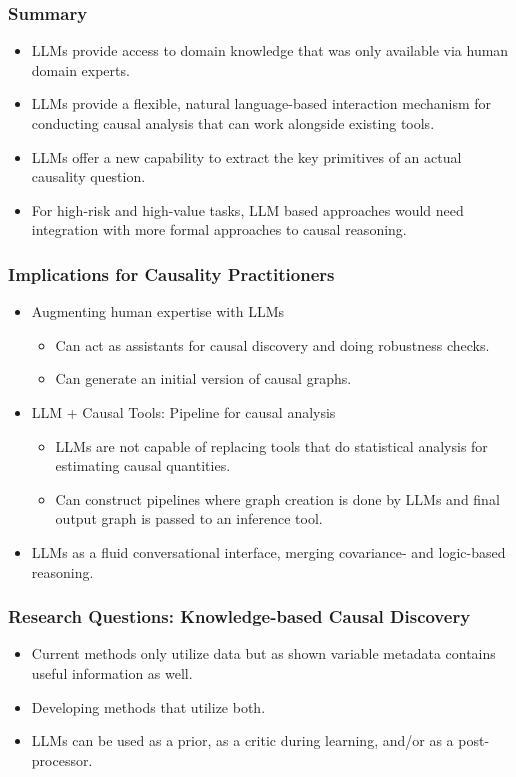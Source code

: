 \documentclass{beamer}
\begin{document}
\begin{frame}
	\frametitle{Summary}
	\begin{itemize}
		\item LLMs provide access to domain knowledge that was only available
			via human domain experts.
		\item LLMs provide a flexible, natural language-based interaction 
			mechanism for conducting causal analysis that can work
			alongside existing tools.
		\item LLMs offer a new capability to extract the key primitives of
			an actual causality question.
		\item For high-risk and high-value tasks, LLM based approaches would
			need integration with more formal approaches to
			causal reasoning.
	\end{itemize}
\end{frame}

\begin{frame}
	\frametitle{Implications for Causality Practitioners}
	\begin{itemize}
		\item Augmenting human expertise with LLMs
			\begin{itemize}
				\item Can act as assistants for causal discovery and
					doing robustness checks.
				\item Can generate an initial version of
					causal graphs.
			\end{itemize}
		\item LLM + Causal Tools: Pipeline for causal analysis
			\begin{itemize}
				\item LLMs are not capable of replacing tools
					that do statistical analysis for
					estimating causal quantities.
				\item Can construct pipelines where graph creation is
					done by LLMs and final output graph is passed to
					an inference tool.
			\end{itemize}
		\item LLMs as a fluid conversational interface, merging covariance-
			and logic-based reasoning.
	\end{itemize}
\end{frame}

\begin{frame}
	\frametitle{Research Questions: Knowledge-based Causal Discovery}
	\begin{itemize}
		\item Current methods only utilize data but as shown variable
			metadata contains useful information as well.
		\item Developing methods that utilize both.
		\item LLMs can be used as a prior, as a critic during learning, and/or
			as a post-processor.
	\end{itemize}
\end{frame}
\end{document}
